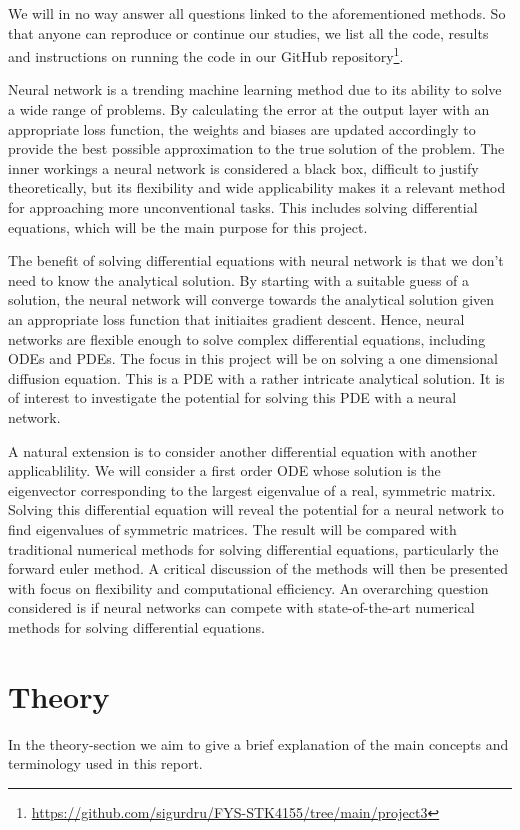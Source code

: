 \documentclass[12pt]{extarticle}
\begin{document}
We will in no way answer all questions linked to the aforementioned methods. So that anyone can reproduce or continue our studies, we list all the code, results and instructions on running the code in our GitHub repository\footnote{\href{https://github.com/sigurdru/FYS-STK4155/tree/main/project2}{https://github.com/sigurdru/FYS-STK4155/tree/main/project3}}.

Neural network is a trending machine learning method due to its ability to solve a wide range of problems. By calculating the error at the output layer with an appropriate loss function, the weights and biases are updated accordingly to provide the best possible approximation to the true solution of the problem. The inner workings a neural network is considered a black box, difficult to justify theoretically, but its flexibility and wide applicability makes it a relevant method for approaching more unconventional tasks. This includes solving differential equations, which will be the main purpose for this project. 

The benefit of solving differential equations with neural network is that we don't need to know the analytical solution. By starting with a suitable guess of a solution, the neural network will converge towards the analytical solution given an appropriate loss function that initiaites gradient descent. Hence, neural networks are flexible enough to solve complex differential equations, including ODEs and PDEs. The focus in this project will be on solving a one dimensional diffusion equation. This is a PDE with a rather intricate analytical solution. It is of interest to investigate the potential for solving this PDE with a neural network.

A natural extension is to consider another differential equation with another applicablility. We will consider a first order ODE whose solution is the eigenvector corresponding to the largest eigenvalue of a real, symmetric matrix. Solving this differential equation will reveal the potential for a neural network to find eigenvalues of symmetric matrices. The result will be compared with traditional numerical methods for solving differential equations, particularly the forward euler method. A critical discussion of the methods will then be presented with focus on flexibility and computational efficiency. An overarching question considered is if neural networks can compete with state-of-the-art numerical methods for solving differential equations.


\section{Theory}
In the theory-section we aim to give a brief explanation of the main concepts and terminology used in this report. 
\end{document}
